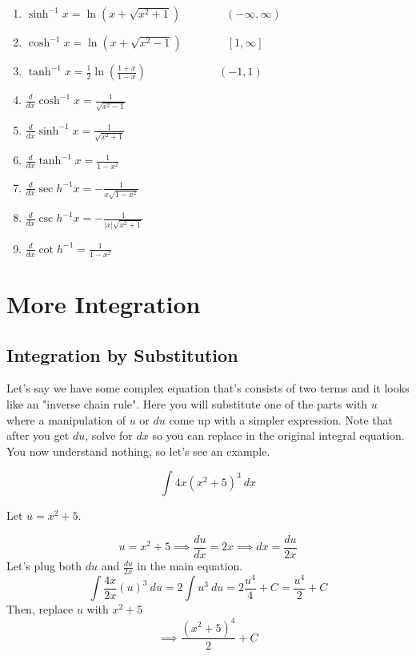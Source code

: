 \documentclass{article}
\begin{document}
\begin{enumerate}[1.]
		\item $ \sinh^{-1}x = \ln(x+ \sqrt{ x^2 +1}) \qquad \qquad (- \infty , \infty )$
		\item $ \cosh^{-1}x = \ln(x+ \sqrt{x^2-1}) \qquad \qquad [1, \infty]$ 
		\item $ \tanh^{-1}x = \frac{1}{2} \ln( \frac{ 1+x }{ 1-x }   ) \qquad \qquad \qquad \ \  (-1,1)$ 


		\item $ \frac{d}{dx} \cosh^{-1}x = \frac{1}{\sqrt{x^2-1}}$ 
		\item $ \frac{d}{dx} \sinh^{-1}x = \frac{1}{ \sqrt{ x^2+1 } } $ 
		\item $ \frac{d}{dx} \tanh^{-1}x = \frac{1}{1-x^2} $ 
		\item $ \frac{d}{dx} \sec h^{-1}x = -\frac{1}{x \sqrt{ 1-x^2 }} $
		\item $ \frac{d}{dx} \csc h^{-1}x = -\frac{1}{|x| \sqrt{ x^2+1 }} $
		\item $ \frac{d}{dx} \cot h^{-1} = \frac{1}{1-x^2}$

	\end{enumerate}
	\newpage


	\section{More Integration}

	\subsection{Integration by Substitution}

	Let's say we have some complex equation that's consists of two terms and it looks like an "inverse chain rule". Here you will substitute one of the parts with $ u $ where a manipulation of $ u $ or $ du $ come up with a simpler expression. Note that after you get $ du $, solve for $ dx $ so you can replace in the original integral equation. You now understand nothing, so let's see an example.

	\[
		\int 4x (x^2+5)^3 \ dx 
	\]

	Let $u=x^2+5$.

	\[
		u = x^2+5 \implies \frac{du}{dx} = 2x \implies dx = \frac{du}{2x}
	\]
	Let's plug both $du$ and $ \frac{du}{2x} $ in the main equation.
	\[
		\int \frac{4x}{2x} (u)^3 \ du = 2\int u^3\ du = 2 \frac{u^4}{4} + C = \frac{u^4}{2} + C
	\]
	Then, replace $u$ with $x^2+5$
	\[
		\implies \frac{ (x^2+5)^4 }{ 2 }  + C
	\]
\end{document}

